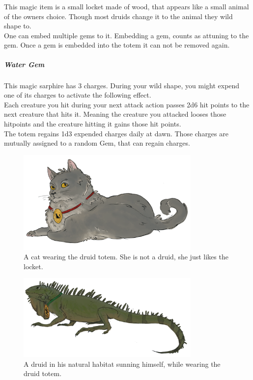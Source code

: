 \documentclass[letter,10pt,twocolumn,openany]{dndbook}
\begin{document}

This magic item is a small locket made of wood, that appears like a small animal of the owners choice. Though most druids change it to the animal they wild shape to.\\
One can embed multiple gems to it. Embedding a gem, counts as attuning to the gem. Once a gem is embedded into the totem it can not be removed again.\\

\subparagraph{Water Gem} This magic sarphire has 3 charges. During your wild shape, you might expend one of its charges to activate the following effect.\\
Each creature you hit during your next attack action passes 2d6 hit points to the next creature that hits it. Meaning the creature you attacked looses those hitpoints and the creature hitting it gains those hit points.\\

The totem regains 1d3 expended charges daily at dawn. Those charges are mutually assigned to a random Gem, that can regain charges.

\begin{figure}
    \includegraphics[width=9cm]{images/cat.png}
    \caption{A cat wearing the druid totem. She is not a druid, she just likes the locket.}
\end{figure}

\begin{figure}
    \includegraphics[width=9cm]{images/iguana.png}
    \caption{A druid in his natural habitat sunning himself, while wearing the druid totem.}
\end{figure}
\end{document}
